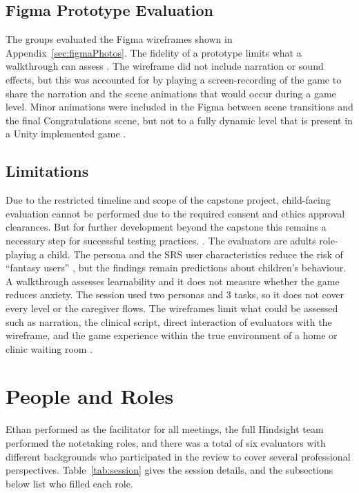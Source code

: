 \documentclass{article}
\begin{document}
\subsection{Figma Prototype Evaluation}

The groups evaluated the Figma wireframes shown in Appendix~\ref{sec:figmaPhotos}. The fidelity of a 
prototype limits what a walkthrough can assess \cite{nng-workshop}. The wireframe did not include 
narration or sound effects, but this was accounted for by playing a screen-recording of the game 
to share the narration and the scene animations that would occur during a game level. Minor 
animations were included in the Figma between scene transitions and the final Congratulations scene,
but not to a fully dynamic level that is present in a Unity implemented game \cite{SRS}.

\subsection{Limitations}
Due to the restricted timeline and scope of the capstone project, child-facing evaluation cannot be 
performed due to the required consent and ethics approval clearances. But for further development 
beyond the capstone this remains a necessary step for successful testing practices. \cite{SRS}. The evaluators 
are adults role-playing a child. The persona and the SRS user characteristics reduce the risk of ``fantasy users'' 
\cite{nng-workshop}, but the findings remain predictions about children's behaviour. A walkthrough assesses 
learnability and it does not measure whether the game reduces anxiety. The session used two personas and 3 tasks,
so it does not cover every level or the caregiver flows. The wireframes limit what could be assessed such as narration, 
the clinical script, direct interaction of evaluators with the wireframe, and the game experience within the 
true environment of a home or clinic waiting room \cite{SRS}.

\section{People and Roles}\label{sec:people}

Ethan performed as the facilitator for all meetings, the full Hindsight team performed the notetaking roles, 
and there was a total of six evaluators with different backgrounds who participated in the review to cover 
several professional perspectives. Table~\ref{tab:session} gives the session details, and the subsections 
below list who filled each role.
\end{document}
